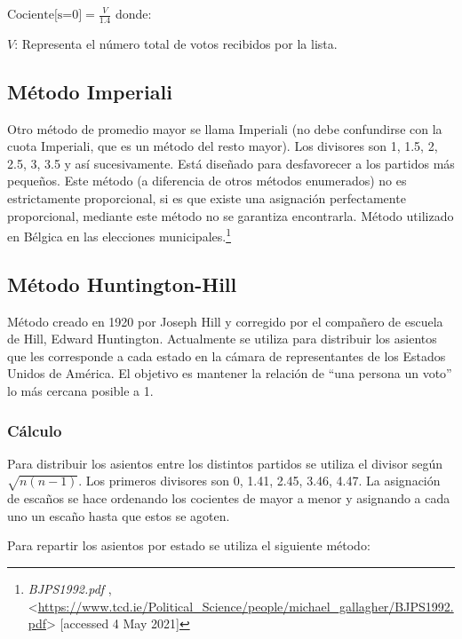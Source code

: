 \documentclass[12pt,a4paper,]{book}
\let\rmarkdownfootnote\footnote%
\def\footnote{\protect\rmarkdownfootnote}
\numberwithin{dummy}{section}
\theoremstyle{ocrenumbox}
\theoremstyle{blacknumex}
\theoremstyle{blacknumbox}
\theoremstyle{ocrenum}
\theoremstyle{ocrenum}
\begin{document}
\(\textrm{Cociente[s=0]} = \frac{V}{1.4}\) donde:

\(V\): Representa el número total de votos recibidos por la lista.

\hypertarget{muxe9todo-imperiali}{%
\subsection{Método Imperiali}\label{muxe9todo-imperiali}}

Otro método de promedio mayor se llama Imperiali (no debe confundirse
con la cuota Imperiali, que es un método del resto mayor). Los divisores
son 1, 1.5, 2, 2.5, 3, 3.5 y así sucesivamente. Está diseñado para
desfavorecer a los partidos más pequeños. Este método (a diferencia de
otros métodos enumerados) no es estrictamente proporcional, si es que
existe una asignación perfectamente proporcional, mediante este método
no se garantiza encontrarla. Método utilizado en Bélgica en las
elecciones municipales.\footnote{\emph{BJPS1992.pdf} ,
  \textless{}\url{https://www.tcd.ie/Political_Science/people/michael_gallagher/BJPS1992.pdf}\textgreater{}
  {[}accessed 4 May 2021{]}}

\hypertarget{muxe9todo-huntington-hill}{%
\subsection{Método Huntington-Hill}\label{muxe9todo-huntington-hill}}

Método creado en 1920 por Joseph Hill y corregido por el compañero de
escuela de Hill, Edward Huntington. Actualmente se utiliza para
distribuir los asientos que les corresponde a cada estado en la cámara
de representantes de los Estados Unidos de América. El objetivo es
mantener la relación de ``una persona un voto'' lo más cercana posible a
1.

\hypertarget{cuxe1lculo}{%
\subsubsection{Cálculo}\label{cuxe1lculo}}

Para distribuir los asientos entre los distintos partidos se utiliza el
divisor según \(\sqrt{n(n-1)}\). Los primeros divisores son 0, 1.41,
2.45, 3.46, 4.47. La asignación de escaños se hace ordenando los
cocientes de mayor a menor y asignando a cada uno un escaño hasta que
estos se agoten.

Para repartir los asientos por estado se utiliza el siguiente método:
\end{document}
